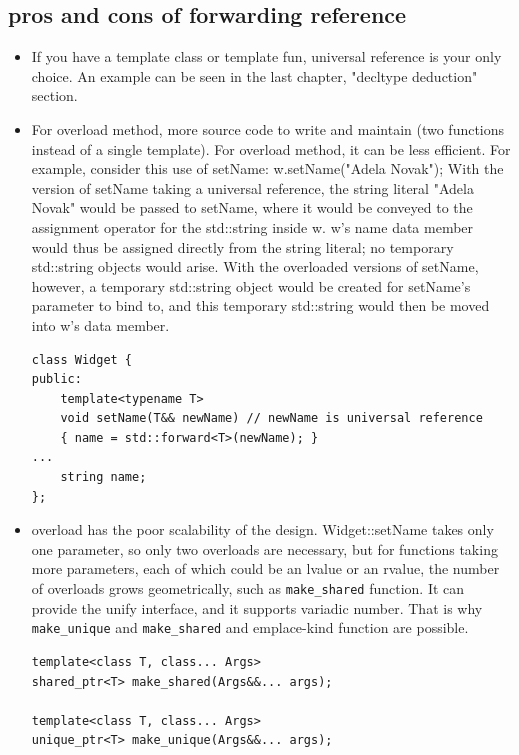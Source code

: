 \documentclass[a4paper,11pt,twoside]{book}
\begin{document}
\subsection{pros and cons of forwarding reference}
\begin{itemize}

\item If you have a template class or template fun, universal reference is your only choice. An example can be seen in the last chapter, "decltype deduction" section.

\item For overload method, more source code to write and maintain (two functions instead of a single template). For overload method, it can be less efficient. For example, consider this use of setName: w.setName("Adela Novak"); With the version of setName taking a universal reference, the string literal "Adela Novak" would be passed to setName, where it would be conveyed to the assignment operator for the std::string inside w. w's name data member would thus be assigned directly from the string literal; no temporary std::string objects would arise. With the overloaded versions of setName, however, a temporary std::string object would be created for setName's parameter to bind to, and this temporary std::string would then be moved into w's data member.

\begin{lstlisting}[numbers=none]
class Widget {
public:
	template<typename T>
	void setName(T&& newName) // newName is universal reference
	{ name = std::forward<T>(newName); }
...
	string name;    
};
\end{lstlisting}

    \item overload has the poor scalability of the design. Widget::setName takes only one parameter, so only two overloads are necessary, but for functions taking more parameters, each of which could be an lvalue or an rvalue, the number of overloads grows geometrically, such as \texttt{make\_shared} function. It can provide the unify interface, and it supports variadic number. That is why \texttt{make\_unique} and \texttt{make\_shared} and emplace-kind function are possible.

\begin{lstlisting}[numbers=none]
template<class T, class... Args> 
shared_ptr<T> make_shared(Args&&... args); 

template<class T, class... Args> 
unique_ptr<T> make_unique(Args&&... args); 
\end{lstlisting}


\end{itemize}
\end{document}
